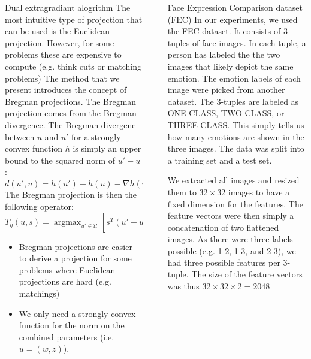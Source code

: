 \documentclass[final]{beamer}
\DeclareMathOperator*{\argmax}{\arg\max}
\newlength{\sepwidth}
\newlength{\colwidth}
\newcommand{\separatorcolumn}{\begin{column}{\sepwidth}\end{column}}
\begin{document}
\begin{frame}[t]
\begin{columns}[t]
\begin{column}{\colwidth}
\begin{block}{Dual extragradiant alogrithm}
    The most intuitive type of projection that can be used is the Euclidean
projection. However, for some problems these are expensive to compute (e.g.
think cuts or matching problems) The method that we present introduces the
concept of Bregman projections. The Bregman projection comes from the Bregman
divergence. The Bregman divergene between $u$ and $u'$ for a strongly convex
function $h$ is simply an upper bound to the squared norm of $u' - u$ :
    \begin{equation*}
      d(u', u) = h(u') - h(u) - \nabla h(u)^T (u' - u) \geq \lVert u' - u \rVert^2
    \end{equation*}
    The Bregman projection is then the following operator:
    \begin{equation*}
      T_{\eta}(u,s) = \argmax_{u' \in \mathcal{U}} \left[ s^T (u' - u) - \frac{1}{\eta} d(u', u)\right]
      \end{equation*}
    \begin{itemize}
      \item Bregman projections are easier to derive a projection for some
problems where Euclidean projections are hard (e.g. matchings)
      \item We only need a strongly convex function for the norm on the combined
parameters (i.e. $u = (w,z)$).
    \end{itemize}
  \end{block}
\end{column}

\separatorcolumn

\begin{column}{\colwidth}

  \begin{alertblock}{Face Expression Comparison dataset (FEC)}
    In our experiments, we used the FEC dataset. It consists of 3-tuples of face
images. In each tuple, a person has labeled the the two images that likely
depict the same emotion. The emotion labels of each image were picked from
another dataset. The 3-tuples are labeled as ONE-CLASS, TWO-CLASS, or
THREE-CLASS. This simply tells us how many emotions are shown in the three
images. The data was split into a training set and a test set.

    We extracted all images and resized them to $32 \times 32$ images to have a
fixed dimension for the features. The feature vectors were then simply a
concatenation of two flattened images. As there were three labels possible (e.g.
1-2, 1-3, and 2-3), we had three possible features per 3-tuple. The size of the
feature vectors was thus $32
\times 32 \times 2 = 2048$


\end{alertblock}
\end{column}
\end{columns}
\end{frame}
\end{document}
